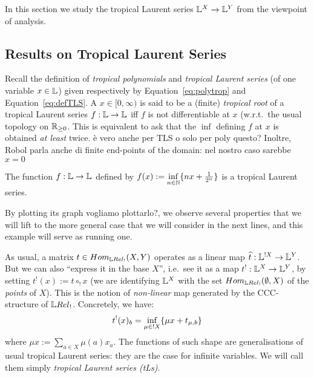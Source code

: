In this section we study the tropical Laurent series $\mathbb{L}^X\to \mathbb{L} ^Y$ from the viewpoint of analysis.

\subsection{Results on Tropical Laurent Series}

Recall the definition of \emph{tropical polynomials} and \emph{tropical Laurent series} (of one variable $x\in\mathbb{L}$) given respectively by Equation~\ref{eq:polytrop} and Equation~\ref{eq:defTLS}.
A $x\in[0,\infty)$ is said to be a (finite) \emph{tropical root} of a tropical Laurent series $f:\mathbb{L}\to\mathbb{L}$ iff $f$ is not differentiable at $x$ (w.r.t.\ the usual topology on $\mathbb{R}_{\geq0}$.
This is equivalent to ask that the $\inf$ defining $f$ at $x$ is obtained \emph{at least} twice.{\color{red} \`e vero anche per TLS o solo per poly questo? Inoltre, Robol parla anche di finite end-points of the domain: nel nostro caso sarebbe $x=0$}

\begin{example}\label{ex:famous_ex}
 The function $f:\mathbb{L}\to\mathbb{L}$ defined by $f(x):=\inf\limits_{n\in\mathbb{N}}\{nx+\frac{1}{2^n}\}$ is a tropical Laurent series.
\end{example}

By plotting its graph {\color{red}vogliamo plottarlo?}, we observe several properties that we will lift to the more general case that we will consider in the next lines, and this example will serve as running one.

\begin{remark}%
 As usual, a matrix $t\in\HOM{\LREL_!}{X}{Y}$ operates as a linear map $\widehat t:\mathbb{L}^{!X}\to\mathbb{L}^Y$.
 But we can also ``express it in the base $X$'', i.e.\ see it as a map $t^!:\mathbb{L}^X\to\mathbb{L}^Y$, by setting $t^!(x):=t\circ_! x$ (we are identifying $\mathbb{L}^X$ with the set $\HOM{\LREL_!}{\emptyset}{X}$ of the \emph{points} of $X$).
 This is the notion of \emph{non-linear} map generated by the CCC-structure of $\LREL_!$.
 Concretely, we have:
 \[t^!(x)_b=\inf\limits_{\mu\in !X} \{\mu x+ t_{\mu,b}\}\] where $\mu x:=\sum\limits_{a\in X} \mu(a)x_a$.
 The functions of such shape are generalisations of usual tropical Laurent series: they are the case for infinite variables.
 We will call them simply \emph{tropical Laurent series (tLs)}.
\end{remark}

